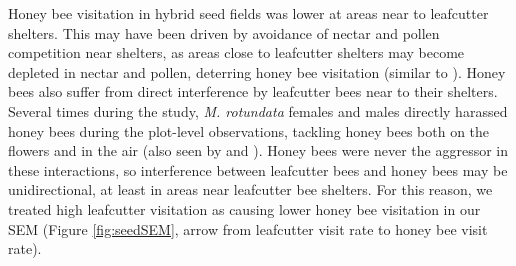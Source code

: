 \documentclass[12pt, draft]{article} %
\begin{document}

Honey bee visitation in hybrid seed fields was lower at areas near to leafcutter shelters. 
This may have been driven by avoidance of nectar and pollen competition near shelters, as areas close to leafcutter shelters may become depleted in nectar and pollen, deterring honey bee visitation (similar to \citealp{currie1997}).
Honey bees also suffer from direct interference by leafcutter bees near to their shelters.
Several times during the study, \textit{M. rotundata} females and males directly harassed honey bees during the plot-level observations, tackling honey bees both on the flowers and in the air (also seen by \citealp{batra1978} and \citealp{waytesMsc}). 
Honey bees were never the aggressor in these interactions, so interference between leafcutter bees and honey bees may be unidirectional, at least in areas near leafcutter bee shelters. 
For this reason, we treated high leafcutter visitation as causing lower honey bee visitation in our SEM (Figure \ref{fig:seedSEM}, arrow from leafcutter visit rate to honey bee visit rate).
\end{document}
